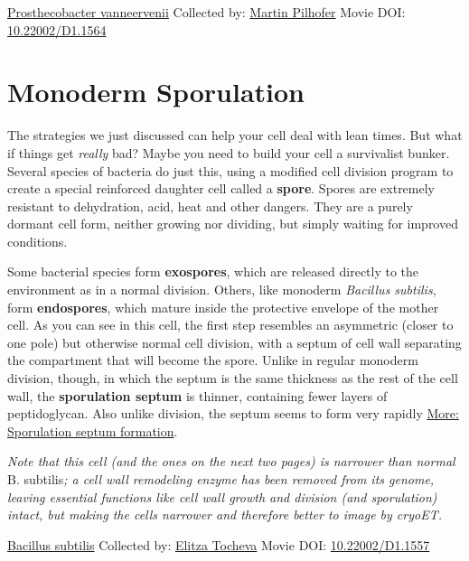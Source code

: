 \documentclass[]{tufte-book}
\begin{document}
\hypertarget{htmlwidget-17971680feb3aa235e90}{}

\label{fig:8-4a}\protect\hyperlink{tree}{Prosthecobacter vanneervenii} Collected by: \protect\hyperlink{martin_pilhofer}{Martin Pilhofer} Movie DOI: \href{https://doi.org/10.22002/D1.1564}{10.22002/D1.1564}

\hypertarget{monoderm-sporulation}{%
\section{Monoderm Sporulation}\label{monoderm-sporulation}}

The strategies we just discussed can help your cell deal with lean times. But what if things get \emph{really} bad? Maybe you need to build your cell a survivalist bunker. Several species of bacteria do just this, using a modified cell division program to create a special reinforced daughter cell called a \textbf{spore}. Spores are extremely resistant to dehydration, acid, heat and other dangers. They are a purely dormant cell form, neither growing nor dividing, but simply waiting for improved conditions.

Some bacterial species form \textbf{exospores}, which are released directly to the environment as in a normal division. Others, like monoderm \emph{Bacillus subtilis}, form \textbf{endospores}, which mature inside the protective envelope of the mother cell. As you can see in this cell, the first step resembles an asymmetric (closer to one pole) but otherwise normal cell division, with a septum of cell wall separating the compartment that will become the spore. Unlike in regular monoderm division, though, in which the septum is the same thickness as the rest of the cell wall, the \textbf{sporulation septum} is thinner, containing fewer layers of peptidoglycan. Also unlike division, the septum seems to form very rapidly \protect\hyperlink{Sporulation_septum_formation}{More: Sporulation septum formation}.

\emph{Note that this cell (and the ones on the next two pages) is narrower than normal }B. subtilis\emph{; a cell wall remodeling enzyme has been removed from its genome, leaving essential functions like cell wall growth and division (and sporulation) intact, but making the cells narrower and therefore better to image by cryoET.}



\hypertarget{htmlwidget-c1a30902b62ecb47a40e}{}

\label{fig:8-5}\protect\hyperlink{tree}{Bacillus subtilis} Collected by: \protect\hyperlink{elitza_tocheva}{Elitza Tocheva} Movie DOI: \href{https://doi.org/10.22002/D1.1557}{10.22002/D1.1557}
\end{document}
